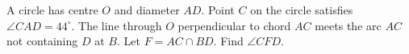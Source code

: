 A circle has centre $O$ and diameter $AD$. Point $C$ on the circle satisfies $\angle CAD=44^\circ$. The line through $O$ perpendicular to chord $AC$ meets the arc $AC$ not containing $D$ at $B$. Let $F=AC\cap BD$. Find $\angle CFD$.
